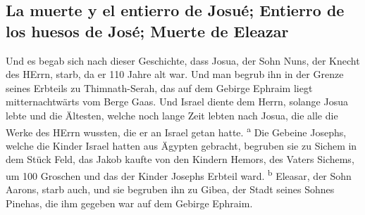 \hypertarget{la-muerte-y-el-entierro-de-josuuxe9-entierro-de-los-huesos-de-josuxe9-muerte-de-eleazar}{%
\subsection{La muerte y el entierro de Josué; Entierro de los huesos de
José; Muerte de
Eleazar}\label{la-muerte-y-el-entierro-de-josuuxe9-entierro-de-los-huesos-de-josuxe9-muerte-de-eleazar}}

 Und es begab sich nach dieser Geschichte, dass Josua,
der Sohn Nuns, der Knecht des HErrn, starb, da er 110 Jahre alt war.
 Und man begrub ihn in der Grenze seines Erbteils zu
Thimnath-Serah, das auf dem Gebirge Ephraim liegt mitternachtwärts vom
Berge Gaas.  Und Israel diente dem Herrn, solange Josua
lebte und die Ältesten, welche noch lange Zeit lebten nach Josua, die
alle die Werke des HErrn wussten, die er an Israel getan hatte.
\textsuperscript{a}  Die Gebeine Josephs, welche die
Kinder Israel hatten aus Ägypten gebracht, begruben sie zu Sichem in dem
Stück Feld, das Jakob kaufte von den Kindern Hemors, des Vaters Sichems,
um 100 Groschen und das der Kinder Josephs Erbteil ward.
\textsuperscript{b}  Eleasar, der Sohn Aarons, starb
auch, und sie begruben ihn zu Gibea, der Stadt seines Sohnes Pinehas,
die ihm gegeben war auf dem Gebirge Ephraim.
